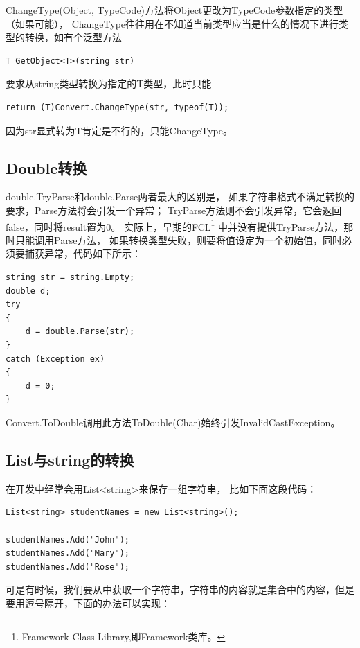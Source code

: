 \documentclass{book}
\begin{document}
ChangeType(Object, TypeCode)方法将Object更改为TypeCode参数指定的类型（如果可能），
ChangeType往往用在不知道当前类型应当是什么的情况下进行类型的转换，如有个泛型方法

\begin{lstlisting}[language={[Sharp]C}]
T GetObject<T>(string str)
\end{lstlisting}

要求从string类型转换为指定的T类型，此时只能

\begin{lstlisting}[language={[Sharp]C}]
return (T)Convert.ChangeType(str, typeof(T));
\end{lstlisting}

因为str显式转为T肯定是不行的，只能ChangeType。

\subsection{Double转换}

double.TryParse和double.Parse两者最大的区别是，
如果字符串格式不满足转换的要求，Parse方法将会引发一个异常；
TryParse方法则不会引发异常，它会返回false，同时将result置为0。
实际上，早期的FCL\footnote{Framework Class Library,即Framework类库。}
中并没有提供TryParse方法，那时只能调用Parse方法，
如果转换类型失败，则要将值设定为一个初始值，同时必须要捕获异常，代码如下所示：

\begin{lstlisting}[language={[Sharp]C}]
string str = string.Empty;  
double d;  
try  
{  
    d = double.Parse(str);  
}  
catch (Exception ex)  
{  
    d = 0;  
}
\end{lstlisting}

Convert.ToDouble调用此方法ToDouble(Char)始终引发InvalidCastException。

\subsection{List与string的转换}

在开发中经常会用List<string>来保存一组字符串，
比如下面这段代码：

\begin{lstlisting}[language={[Sharp]C}]
List<string> studentNames = new List<string>();

studentNames.Add("John");
studentNames.Add("Mary");
studentNames.Add("Rose");
\end{lstlisting}

可是有时候，我们要从中获取一个字符串，字符串的内容就是集合中的内容，但是要用逗号隔开，下面的办法可以实现：
\end{document}
